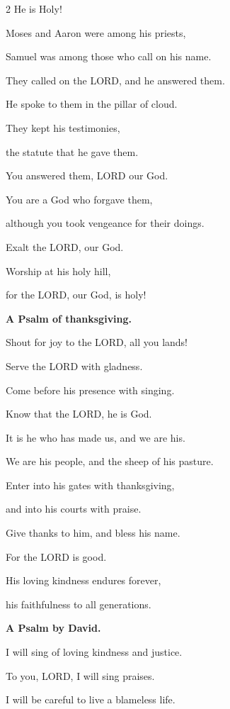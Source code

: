 \begin{multicols}{2}
	He is Holy!
	
		\vspace{\baselineskip}
	
	
	\myverse{}Moses and Aaron were among his priests,
	
	Samuel was among those who call on his name.
	
	They called on the LORD, and he answered them.
	
	
	\myverse{}He spoke to them in the pillar of cloud.
	
	They kept his testimonies,
	
	the statute that he gave them.
	
	
	\myverse{}You answered them, LORD our God.
	
	You are a God who forgave them,
	
	although you took vengeance for their doings.
	
	
	\myverse{}Exalt the LORD, our God.
	
	Worship at his holy hill,
	
	for the LORD, our God, is holy!
	
	
	\mychapter{}\textbf{A Psalm of thanksgiving.}
	
	\quad\quad\quad \myverse*{}Shout for joy to the LORD, all you lands!
	
	
	\myverse{}Serve the LORD with gladness.
	
	Come before his presence with singing.
	
	
	\myverse{}Know that the LORD, he is God.
	
	It is he who has made us, and we are his.
	
	We are his people, and the sheep of his pasture.
	
	
	\myverse{}Enter into his gates with thanksgiving,
	
	and into his courts with praise.
	
	Give thanks to him, and bless his name.
	
	
	\myverse{}For the LORD is good.
	
	His loving kindness endures forever,
	
	his faithfulness to all generations.
	
	
	\mychapter{}\textbf{A Psalm by David.}
	
	\quad\quad\quad \myverse*{}I will sing of loving kindness and justice.
	
	To you, LORD, I will sing praises.
	
	
	\myverse{}I will be careful to live a blameless life.
	

\end{multicols}
